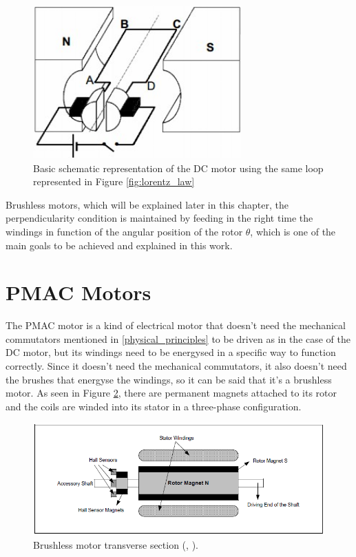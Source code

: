 \begin{figure}[htbp]
\centering
\includegraphics[width=8cm]{Images/dc_motor.png} 
\caption[DC Motor Scheme]{Basic schematic representation of the \ac{DC} motor using the same loop represented in Figure \ref{fig:lorentz_law}}
\label{fig:dc_motor}
\end{figure}

Brushless motors, which will be explained later in this chapter, the perpendicularity condition is maintained by feeding in the right time the windings in function of the angular position of the rotor $\theta$, which is one of the main goals to be achieved and explained in this work.

\section{PMAC Motors}

The \acf{PMAC} motor is a kind of electrical motor that doesn't need the mechanical commutators mentioned in \ref{physical_principles} to be driven as in the case of the DC motor, but its windings need to be energysed in a specific way to function correctly. Since it doesn't need the mechanical commutators, it also doesn't need the brushes that energyse the windings, so it can be said that it's a brushless motor. As seen in Figure \ref{fig:brushless_section}, there are permanent magnets attached to its rotor and the coils are winded into its stator in a three-phase configuration.

\begin{figure}[htbp]
	\centering
	\includegraphics[width=12cm]{Images/brushless_section.png} 
	\caption[Brushless Motor Transverse Section]{Brushless motor transverse section (\citeauthor{microchip}, \citeyear{microchip}).}
	\label{fig:brushless_section}
\end{figure}

